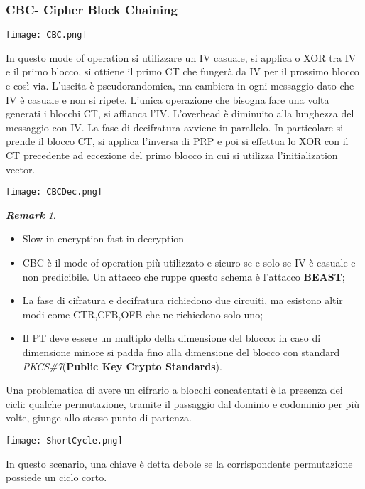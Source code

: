 \documentclass{article}
\theoremstyle{remark}
\newtheorem*{remark}{\textbf{Remark}}
\begin{document}
\subsubsection{CBC- Cipher Block Chaining}
\begin{center}
    \texttt{[image: CBC.png]}
\end{center}
In questo mode of operation si utilizzare un IV casuale, si applica o XOR tra IV e il primo blocco, si ottiene il primo CT che fungerà da IV per il prossimo blocco e così via. L'uscita è pseudorandomica, ma cambiera in ogni messaggio dato che IV è casuale e non si ripete. L'unica operazione che bisogna fare una volta generati i blocchi CT, si affianca l'IV.\newline
L'overhead è diminuito alla lunghezza del messaggio con IV.\newline
La fase di decifratura avviene in parallelo. In particolare si prende il blocco CT, si applica l'inversa di PRP e poi si effettua lo XOR con il CT precedente ad eccezione del primo blocco in cui si utilizza l'initialization vector.
\begin{center}
    \texttt{[image: CBCDec.png]}
\end{center}
\begin{remark}
\begin{itemize}
\item Slow in encryption fast in decryption
    \item CBC è il mode of operation più utilizzato e sicuro se e solo se IV è casuale e non predicibile. Un attacco che ruppe questo schema è l'attacco \textbf{BEAST};
    \item La fase di cifratura e decifratura richiedono due circuiti, ma esistono altir modi come CTR,CFB,OFB che ne richiedono solo uno;
    \item Il PT deve essere un multiplo della dimensione del blocco: in caso di dimensione minore si padda fino alla dimensione del blocco con standard \emph{PKCS\#7}(\textbf{Public Key Crypto Standards}).
\end{itemize}
\end{remark}\newpage
Una problematica di avere un cifrario a blocchi concatentati è la presenza dei cicli: qualche permutazione, tramite il passaggio dal dominio e codominio per più volte, giunge allo stesso punto di partenza.
\begin{center}
    \texttt{[image: ShortCycle.png]}
\end{center}
In questo scenario, una chiave è detta debole se la corrispondente permutazione possiede un ciclo corto.
\end{document}
